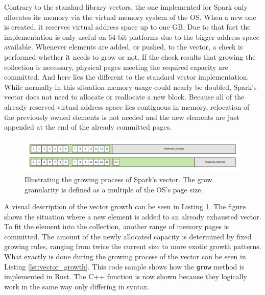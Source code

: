 Contrary to the standard library vectors, the one implemented for Spark only allocates its memory via the virtual memory system of the \ac{OS}. When a new one is created, it reserves virtual address space up to one \ac{GB}. Due to that fact the implementation is only useful on 64-bit platforms due to the bigger address space available. Whenever elements are added, or pushed, to the vector, a check is performed whether it needs to grow or not. If the check results that growing the collection is necessary, physical pages meeting the required capacity are committed. And here lies the different to the standard vector implementation. While normally in this situation memory usage could nearly be doubled, Spark's vector does not need to allocate or reallocate a new block. Because all of the already reserved virtual address space lies contiguous in memory, relocation of the previously owned elements is not needed and the new elements are just appended at the end of the already committed pages.\\

\begin{figure}[h!]
	\centering \includegraphics[width=\linewidth]{PICs/vector_growth.png}
	\caption{Illustrating the growing process of Spark's vector. The grow granularity is defined as a multiple of the \ac{OS}'s page size.}
	\label{fig:vector_growth}
\end{figure}

\noindent
A visual description of the vector growth can be seen in Listing \ref{fig:vector_growth}. The figure shows the situation where a new element is added to an already exhausted vector. To fit the element into the collection, another range of memory pages is committed. The amount of the newly allocated capacity is determined by fixed growing rules, ranging from twice the current size to more exotic growth patterns. What exactly is done during the growing process of the vector can be seen in Listing \ref{lst:vector_growth}. This code sample shows how the \texttt{grow} method is implemented in Rust. The C++ function is now shown because they logically work in the same way only differing in syntax.\\


